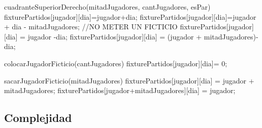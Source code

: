\documentclass[11pt, a4paper, spanish]{article}
\begin{document}
\begin{algorithmic}
		\STATE	cuadranteSuperiorDerecho(mitadJugadores, cantJugadores, esPar)
						\STATE	fixturePartidos[jugador][dia]=jugador+dia;
					\ELSE
						\STATE	fixturePartidos[jugador][dia]=jugador + dia - mitadJugadores;  //NO METER UN FICTICIO
					\ENDIF
				\ENDFOR
			\ENDFOR
		\ELSE
						\STATE	fixturePartidos[jugador][dia] = jugador -dia;
					\ELSE
						\STATE	fixturePartidos[jugador][dia] = (jugador + mitadJugadores)-dia;
					\ENDIF
				\ENDFOR
			\ENDFOR
		\ENDIF	
	
		\STATE	colocarJugadorFicticio(cantJugadores)
					\STATE	fixturePartidos[jugador][dia]= 0;
				\ENDIF
			\ENDFOR
		\ENDFOR
		
		sacarJugadorFicticio(mitadJugadores)
					\STATE	fixturePartidos[jugador][dia] = jugador + mitadJugadores; 
	 				\STATE	fixturePartidos[jugador+mitadJugadores][dia] = jugador;
				\ENDIF
			\ENDFOR
		\ENDFOR
	 
\end{algorithmic}	

\subsection{Complejidad}
	
\end{document}
